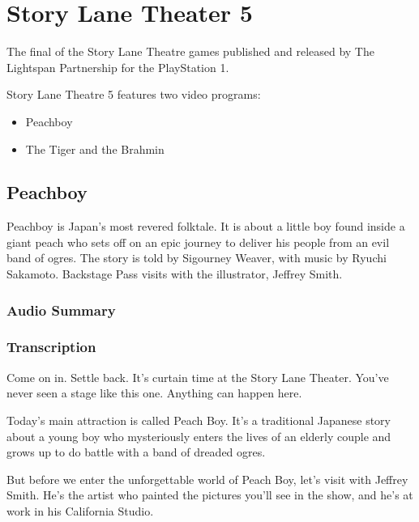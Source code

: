 \chapter{Story Lane Theater 5}


The final of the Story Lane Theatre games published and released by The Lightspan Partnership for the PlayStation 1.

Story Lane Theatre 5 features two video programs:

\begin{itemize}
    \item Peachboy
    \item The Tiger and the Brahmin
\end{itemize}

\clearpage
\newpage

\section{Peachboy}

Peachboy is Japan's most revered folktale. It is about a little boy found inside a giant peach who sets off on an epic journey to deliver his people from an evil band of ogres. The story is told by Sigourney Weaver, with music by Ryuchi Sakamoto. Backstage Pass visits with the illustrator, Jeffrey Smith.

\subsection{Audio Summary}

\subsection{Transcription}

Come on in. Settle back. It's curtain time at the Story Lane Theater. You've never seen a stage like this one. Anything can happen here.

Today's main attraction is called Peach Boy. It's a traditional Japanese story about a young boy who mysteriously enters the lives of an elderly couple and grows up to do battle with a band of dreaded ogres.

But before we enter the unforgettable world of Peach Boy, let's visit with Jeffrey Smith. He's the artist who painted the pictures you'll see in the show, and he's at work in his California Studio.

